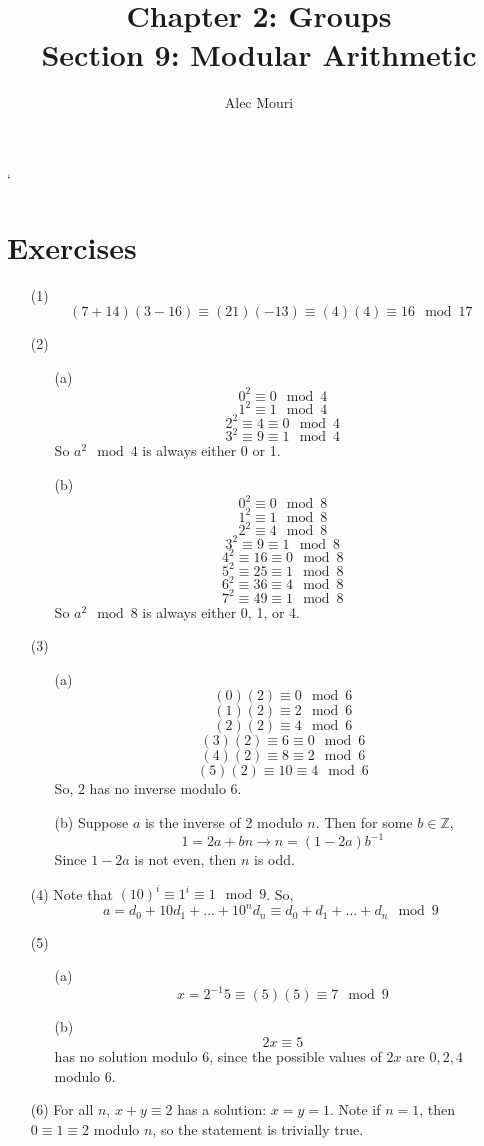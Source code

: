 \documentclass[12pt]{article}
\begin{document}
\title{Chapter 2: Groups \\ Section 9: Modular Arithmetic}
\author{Alec Mouri}

\maketitle`
\section*{Exercises}
\begin{itemize}
\item[(1)]
$$(7 + 14)(3 - 16)\equiv (21)(-13) \equiv (4)(4) \equiv 16 \mod 17$$
\item[(2)]
\begin{itemize}
\item[(a)]
$$0^2 \equiv 0 \mod 4$$
$$1^2 \equiv 1 \mod 4$$
$$2^2 \equiv 4 \equiv 0 \mod 4$$
$$3^2 \equiv 9 \equiv 1 \mod 4$$
So $a^2 \mod 4$ is always either 0 or 1.
\item[(b)]
$$0^2 \equiv 0 \mod 8$$
$$1^2 \equiv 1 \mod 8$$
$$2^2 \equiv 4 \mod 8$$
$$3^2 \equiv 9 \equiv 1 \mod 8$$
$$4^2 \equiv 16 \equiv 0 \mod 8$$
$$5^2 \equiv 25 \equiv 1 \mod 8$$
$$6^2 \equiv 36 \equiv 4 \mod 8$$
$$7^2 \equiv 49 \equiv 1 \mod 8$$
So $a^2 \mod 8$ is always either 0, 1, or 4.
\end{itemize}
\item[(3)]
\begin{itemize}
\item[(a)]
$$(0)(2) \equiv 0 \mod 6$$
$$(1)(2) \equiv 2 \mod 6$$
$$(2)(2) \equiv 4 \mod 6$$
$$(3)(2) \equiv 6 \equiv 0 \mod 6$$
$$(4)(2) \equiv 8 \equiv 2 \mod 6$$
$$(5)(2) \equiv 10 \equiv 4 \mod 6$$
So, $2$ has no inverse modulo 6.
\item[(b)]
Suppose $a$ is the inverse of 2 modulo $n$. Then for some $b \in \mathbb{Z}$,
$$1 = 2a + bn \rightarrow n = (1 - 2a)b^{-1}$$
Since $1 - 2a$ is not even, then $n$ is odd.
\end{itemize}
\item[(4)]
Note that $(10)^i \equiv 1^i \equiv 1 \mod 9$. So,
$$a = d_0 + 10d_1 + ... + 10^nd_n \equiv d_0 + d_1 + ... + d_n \mod 9$$
\item[(5)]
\begin{itemize}
\item[(a)]
$$x = 2^{-1}5 \equiv (5)(5) \equiv 7 \mod 9$$
\item[(b)]
$$2x \equiv 5$$ has no solution modulo 6, since the possible values of $2x$ are $0, 2, 4$ modulo 6.
\end{itemize}
\item[(6)]
For all $n$, $x + y \equiv 2$ has a solution: $x = y = 1$. Note if $n = 1$, then $0 \equiv 1 \equiv 2$ modulo $n$, so the statement is trivially true.


\end{itemize}
\end{document}
